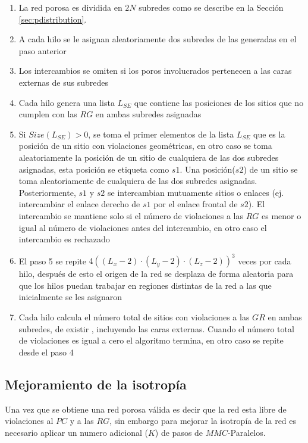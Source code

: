 \begin{enumerate}
\item La red porosa es dividida en $2N$ subredes como se describe en la Sección \ref{sec:pdistribution}.

\item A cada hilo se le asignan aleatoriamente dos subredes de las generadas en el paso anterior

\item Los intercambios se omiten si los poros involucrados pertenecen a las caras  externas de sus subredes

\item Cada hilo genera una lista $L_{SE}$ que contiene las posiciones de los sitios que no cumplen con las $RG$ en ambas subredes asignadas 

\item Si $Size(L_{SE}) > 0$, se toma el primer elementos de la lista $L_{SE}$ que es la posición de un sitio con violaciones geométricas,  en otro caso se toma aleatoriamente la posición de un sitio de cualquiera de las dos subredes asignadas, esta posición se  etiqueta como $s1$. Una posición($s2$) de un sitio se toma aleatoriamente de cualquiera de las dos subredes asignadas. Posteriormente,  $s1$ y $s2$ se intercambian mutuamente sitios o enlaces (ej. intercambiar el enlace derecho de $s1$ por el enlace frontal de $s2$). El  intercambio se mantiene solo si el número de violaciones a las $RG$ es menor o igual al número de violaciones antes del intercambio, en  otro caso el intercambio es rechazado

\item El paso 5 se repite $4(( L_x  - 2) \cdot (L_y - 2) \cdot (L_z - 2))^3$ veces por cada hilo, después de esto el origen de la red 
se desplaza de forma aleatoria para que los hilos puedan trabajar en regiones distintas de la red a las que inicialmente se les asignaron

\item Cada hilo calcula el número total de sitios con violaciones a las $GR$ en ambas subredes, de existir , incluyendo las caras 
externas. Cuando el número total de violaciones es igual a cero el algoritmo termina, en otro caso se repite desde el paso 4
\end{enumerate}

\subsection{Mejoramiento de la isotropía}
\label{subsec:phisotropy}
Una vez que se obtiene una red porosa válida es decir que la red esta libre de violaciones al $PC$ y a las $RG$, sin embargo 
para mejorar la isotropía de la red es necesario aplicar un numero adicional ($K$) de pasos de $MMC$-Paralelos.

